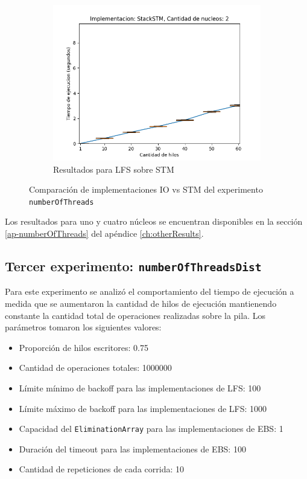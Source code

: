 \begin{figure}[!h]
\begin{subfigure}[b]{0.49\textwidth}
        \includegraphics[width=\textwidth]{images/numberOfThreads/plots/expStackSTM-2}
        \caption{Resultados para LFS sobre STM}
        \label{subfig:numberOfThreads-stackstm-2}
    \end{subfigure}
    \caption{Comparación de implementaciones IO vs STM del experimento \texttt{numberOfThreads}}
    \label{fig:numberOfThreads-boxplots}
\end{figure}

Los resultados para uno y cuatro núcleos se encuentran disponibles en la sección \ref{ap-numberOfThreads} del apéndice \ref{ch:otherResults}.

\clearpage
\subsection{Tercer experimento: \texttt{numberOfThreadsDist}}
Para este experimento se analizó el comportamiento del tiempo de ejecución a medida que se aumentaron la cantidad de hilos de ejecución mantienendo constante la cantidad total de operaciones realizadas sobre la pila.
Los parámetros tomaron los siguientes valores:

\begin{itemize}
    \item Proporción de hilos escritores: 0.75
    \item Cantidad de operaciones totales: 1000000
    \item Límite mínimo de backoff para las implementaciones de LFS: 100
    \item Límite máximo de backoff para las implementaciones de LFS: 1000
    \item Capacidad del \texttt{EliminationArray} para las implementaciones de EBS: 1
    \item Duración del timeout para las implementaciones de EBS: 100
    \item Cantidad de repeticiones de cada corrida: 10
\end{itemize}

